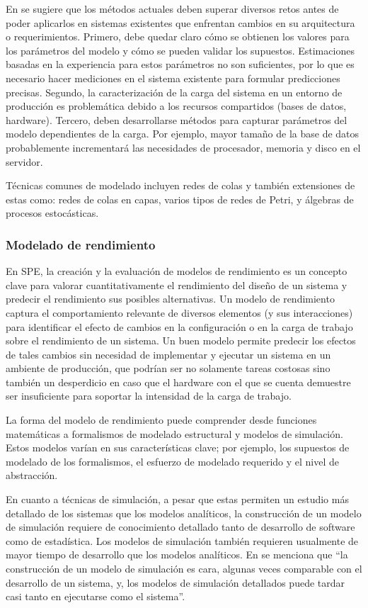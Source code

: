 En \cite{Jin:2007:PEP:1248820.1248885} se sugiere que los métodos actuales deben superar diversos retos antes de poder aplicarlos en sistemas existentes que enfrentan cambios en su arquitectura o requerimientos. Primero, debe quedar claro cómo se obtienen los valores para los parámetros del modelo y cómo se pueden validar los supuestos. Estimaciones basadas en la experiencia para estos parámetros no son suficientes, por lo que es necesario hacer mediciones en el sistema existente para formular predicciones precisas. Segundo, la caracterización de la carga del sistema en un entorno de producción es problemática debido a los recursos compartidos (bases de datos, hardware). Tercero, deben desarrollarse métodos para capturar parámetros del modelo dependientes de la carga. Por ejemplo, mayor tamaño de la base de datos probablemente incrementará las necesidades de procesador, memoria y disco en el servidor.

Técnicas comunes de modelado incluyen redes de colas y también extensiones de estas como: redes de colas en capas, varios tipos de redes de Petri, y álgebras de procesos estocásticas.

\subsubsection{Modelado de rendimiento}
En SPE, la creación y la evaluación de modelos de rendimiento es un concepto clave para valorar cuantitativamente el rendimiento del diseño de un sistema y predecir el rendimiento sus posibles alternativas. Un modelo de rendimiento captura el comportamiento relevante de diversos elementos (y sus interacciones) para identificar el efecto de cambios en la configuración o en la carga de trabajo sobre el rendimiento de un sistema. Un buen modelo permite predecir los efectos de tales cambios sin necesidad de implementar y ejecutar un sistema en un ambiente de producción, que podrían ser no solamente tareas costosas sino también un desperdicio en caso que el hardware con el que se cuenta demuestre ser insuficiente para soportar la intensidad de la carga de trabajo.\cite{Noorshams2015_1000046750}

La forma del modelo de rendimiento puede comprender desde funciones matemáticas a formalismos de modelado estructural y modelos de simulación. Estos modelos varían en sus características clave; por ejemplo, los supuestos de modelado de los formalismos, el esfuerzo de modelado requerido y el nivel de abstracción.

En cuanto a técnicas de simulación, a pesar que estas permiten un estudio más detallado de los sistemas que los modelos analíticos, la construcción de un modelo de simulación requiere de conocimiento detallado tanto de desarrollo de software como de estadística\cite{Gooijer2011PerformanceMO}. Los modelos de simulación también requieren usualmente de mayor tiempo de desarrollo que los modelos analíticos. En \cite{4221619} se menciona que ``la construcción de un modelo de simulación es cara, algunas veces comparable con el desarrollo de un sistema, y, los modelos de simulación detallados puede tardar casi tanto en ejecutarse como el sistema''.

